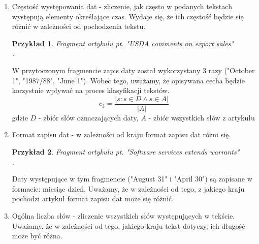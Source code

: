 \documentclass{classrep}
\newtheorem{exmp}{Przykład}[section]
\begin{document}
\begin{enumerate}
    \item Częstość występowania dat - zliczenie, jak często w podanych tekstach występują elementy określające czas. Wydaje się, że ich częstość będzie się różnić w zależności od pochodzenia tekstu. \\
    \begin{exmp} Fragment artykułu pt. "USDA comments on export sales"  \cite{reuters} \\
    . \\
    \end{exmp}W przytoczonym fragmencie zapis daty został wykorzystany 3 razy ("October 1", "1987/88", "June 1"). Wobec tego, uważamy, że opisywana cecha będzie korzystnie wpływać na proces klasyfikacji tekstów. 
    \begin{equation}
        c_3 = \frac{|{s: s \in D \land s \in A}|}{|A|}
    \end{equation}
    gdzie $D$ - zbiór słów oznaczających daty, $A$ - zbiór wszystkich słów z artykułu \\
    \item Format zapisu dat - w zależności od kraju format zapisu dat różni się. \\ \begin{exmp} Fragment artykułu pt. "Software services extends warrants" \cite{reuters} \\ .\\
    \end{exmp} Daty występujące w tym fragmencie ("August 31" i "April 30") są zapisane w formacie: miesiąc dzień. Uważamy, że w zależności od tego, z jakiego kraju pochodzi artykuł format zapisu dat może się różnić. \\
    \item Ogólna liczba słów - zliczenie wszystkich słów występujących w tekście. Uważamy, że w zależności od tego, jakiego kraju tekst dotyczy, ich długość może być różna.

\end{enumerate}
\end{document}
